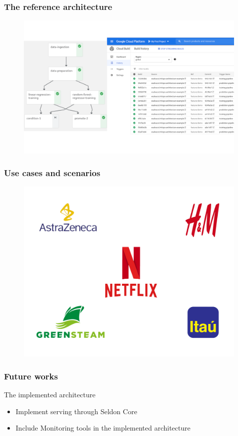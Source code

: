 \documentclass{beamer}
\begin{document}
\begin{frame}
\frametitle{The reference architecture}
\begin{figure}
\includegraphics[scale=0.80]{figure/kubeflow_pipeline_gcb.png}
\end{figure}

\end{frame}

\begin{frame}
\frametitle{Use cases and scenarios}
\begin{figure}
\includegraphics[scale=0.8]{figure/use_cases_companies.png}
\end{figure}
\end{frame}

\begin{frame}
\frametitle{Future works}

\begin{block}{The implemented architecture}
    \begin{itemize}
        \item Implement serving through Seldon Core
        \item Include Monitoring tools in the implemented architecture
    \end{itemize}
\end{block}

\end{frame}
\end{document}
